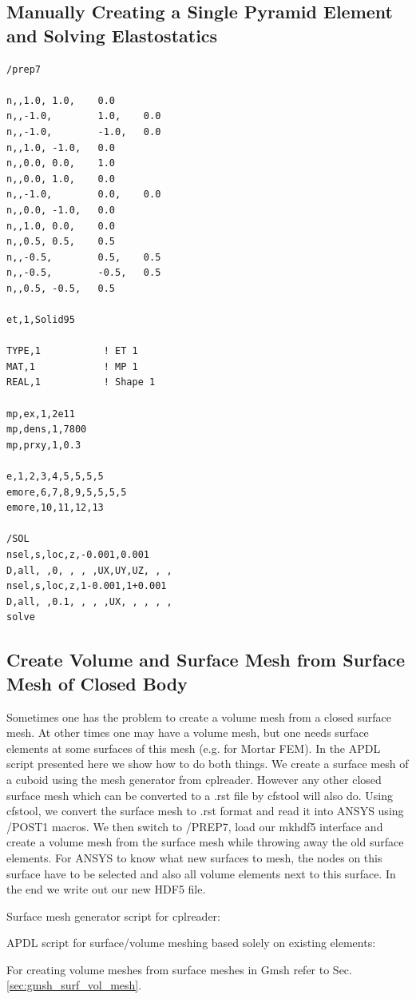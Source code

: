 \subsection{Manually Creating a Single Pyramid Element and Solving Elastostatics}

\begin{verbatim}
/prep7

n,,1.0, 1.0,    0.0
n,,-1.0,        1.0,    0.0
n,,-1.0,        -1.0,   0.0
n,,1.0, -1.0,   0.0
n,,0.0, 0.0,    1.0
n,,0.0, 1.0,    0.0
n,,-1.0,        0.0,    0.0
n,,0.0, -1.0,   0.0
n,,1.0, 0.0,    0.0
n,,0.5, 0.5,    0.5
n,,-0.5,        0.5,    0.5
n,,-0.5,        -0.5,   0.5
n,,0.5, -0.5,   0.5

et,1,Solid95

TYPE,1           ! ET 1
MAT,1            ! MP 1
REAL,1           ! Shape 1

mp,ex,1,2e11
mp,dens,1,7800
mp,prxy,1,0.3

e,1,2,3,4,5,5,5,5
emore,6,7,8,9,5,5,5,5
emore,10,11,12,13

/SOL
nsel,s,loc,z,-0.001,0.001
D,all, ,0, , , ,UX,UY,UZ, , ,
nsel,s,loc,z,1-0.001,1+0.001
D,all, ,0.1, , , ,UX, , , , ,
solve
\end{verbatim}

\subsection{Create Volume and Surface Mesh from Surface Mesh of Closed Body}
\label{sec:ansys_surf_vol_mesh}

Sometimes one  has the problem to create  a volume mesh from  a closed surface
mesh.   At other  times one  may have  a volume  mesh, but  one  needs surface
elements at  some surfaces  of this mesh  (e.g. for  Mortar FEM). In  the APDL
script presented here we show how to do both things.  We create a surface mesh
of a cuboid using the mesh  generator from cplreader. However any other closed
surface  mesh which  can be  converted to  a .rst  file by  cfstool  will also
do. Using cfstool, we convert the surface mesh to .rst format and read it into
ANSYS  using  /POST1  macros.  We  then  switch  to  /PREP7, load  our  mkhdf5
interface and create  a volume mesh from the surface  mesh while throwing away
the old  surface elements. For  ANSYS to know  what new surfaces to  mesh, the
nodes on this surface have to be selected and also all volume elements next to
this surface. In the end we write out our new HDF5 file.

\noindent Surface mesh generator script for cplreader:

\noindent APDL script for surface/volume meshing based solely on existing elements:

\noindent  For creating volume  meshes from  surface meshes  in Gmsh  refer to
Sec. \ref{sec:gmsh_surf_vol_mesh}.



